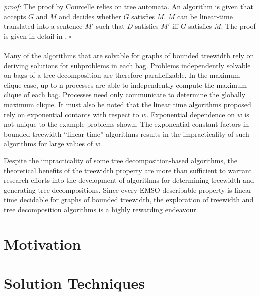\documentclass[12pt,conference]{IEEEtran}
\theoremstyle{plain}
\begin{document}
\textit{proof:} 
  The proof by Courcelle relies on tree automata. An algorithm is given that accepts $G$ and $M$ and decides whether $G$ satisfies $M$. $M$ can be linear-time translated into a sentence $M'$ such that $D$ satisfies $M'$ iff $G$ satisfies $M$. The proof is given in detail in \cite{courcelle-original}. $\square$
\\
\\
Many of the algorithms that are solvable for graphs of bounded treewidth rely on deriving solutions for subproblems in each bag. Problems independently solvable on bags of a tree decomposition are therefore parallelizable. In the maximum clique case, up to n processes are able to independently compute the maximum clique of each bag. Processes need only communicate to determine the globally maximum clique. It must also be noted that the linear time algorithms proposed rely on exponential contants with respect to $w$. Exponential dependence on $w$ is not unique to the example problems shown. The exponential constant factors in bounded treewidth ``linear time'' algorithms results in the impracticality of such algorithms for large values of $w$.

Despite the impracticality of some tree decomposition-based algorithms, the theoretical benefits of the treewidth property are more than sufficient to warrant research efforts into the development of algorithms for determining treewidth and generating tree decompositions. Since every EMSO-describable property is linear time decidable for graphs of bounded treewidth, the exploration of treewidth and tree decomposition algorithms is a highly rewarding endeavour.


\section{Motivation}


\section{Solution Techniques}


\end{document}
